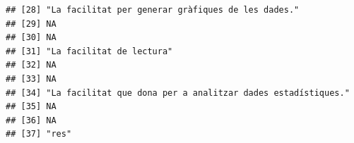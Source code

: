 \documentclass[
]{article}
\begin{document}
\begin{verbatim}
## [28] "La facilitat per generar gràfiques de les dades."                                                                                                                                                                                                                           
## [29] NA                                                                                                                                                                                                                                                                           
## [30] NA                                                                                                                                                                                                                                                                           
## [31] "La facilitat de lectura"                                                                                                                                                                                                                                                    
## [32] NA                                                                                                                                                                                                                                                                           
## [33] NA                                                                                                                                                                                                                                                                           
## [34] "La facilitat que dona per a analitzar dades estadístiques."                                                                                                                                                                                                                 
## [35] NA                                                                                                                                                                                                                                                                           
## [36] NA                                                                                                                                                                                                                                                                           
## [37] "res"                                                                                                                                                                                                                                                                        

\end{verbatim}
\end{document}
